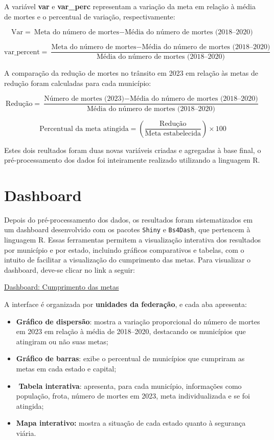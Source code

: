\documentclass[
  letterpaper,
  DIV=11,
  numbers=noendperiod]{scrreprt}
\begin{document}
A variável \textbf{var} e \textbf{var\_perc} representam a variação da
meta em relação à média de mortes e o percentual de variação,
respectivamente:

\[
\text{Var} = {\text{Meta do número de mortes} - \text{Média do número de mortes (2018–2020)}}
\]

\[
\text{var_percent} = \frac{\text{Meta do número de mortes} - \text{Média do número de mortes (2018–2020)}}{\text{Média do número de mortes (2018–2020)}}
\]

A comparação da redução de mortes no trânsito em 2023 em relação às
metas de redução foram calculadas para cada município:

\[
\text{Redução} = \frac{\text{Número de mortes (2023)} - \text{Média do número de mortes (2018–2020)}}{\text{Média do número de mortes (2018–2020)}}
\]

\[
\text{Percentual da meta atingida} = \left( \frac{\text{Redução}}{\text{Meta estabelecida}} \right) \times 100
\]

Estes dois reultados foram duas novas variáveis criadas e agregadas à
base final, o pré-processamento dos dados foi inteiramente realizado
utilizando a linguagem R.

\section{Dashboard}\label{dashboard}

Depois do pré-processamento dos dados, os resultados foram
sistematizados em um dashboard desenvolvido com os pacotes
\texttt{Shiny} e \texttt{Bs4Dash}, que pertencem à linguagem R. Essas
ferramentas permitem a visualização interativa dos resultados por
município e por estado, incluindo gráficos comparativos e tabelas, com o
intuito de facilitar a visualização do cumprimento das metas. Para
visualizar o dashboard, deve-se clicar no link a seguir:

\href{https://beatrizmarques.shinyapps.io/cumprimento_metas/}{Dashboard:
Cumprimento das metas}

A interface é organizada por \textbf{unidades da federação}, e cada aba
apresenta:

\begin{itemize}
\item
  \textbf{Gráfico de dispersão}: mostra a variação proporcional do
  número de mortes em 2023 em relação à média de 2018--2020, destacando
  os municípios que atingiram ou não suas metas;
\item
  \textbf{Gráfico de barras}: exibe o percentual de municípios que
  cumpriram as metas em cada estado e capital;
\item
  ️ \textbf{Tabela interativa}: apresenta, para cada município,
  informações como população, frota, número de mortes em 2023, meta
  individualizada e se foi atingida;
\item
  \textbf{Mapa interativo:} mostra a situação de cada estado quanto à
  segurança viária.
\end{itemize}
\end{document}
